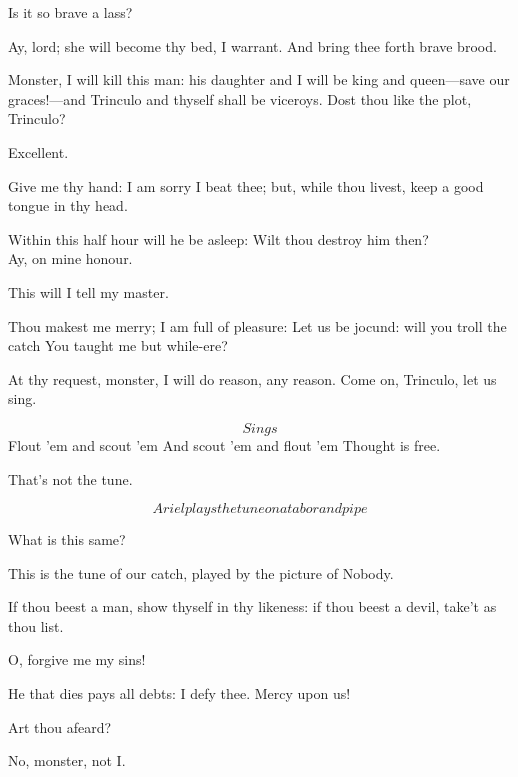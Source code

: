 \documentclass[11pt]{book}
\begin{document}
	Is it so brave a lass?

\5	Ay, lord; she will become thy bed, I warrant.
	And bring thee forth brave brood.

\begin{PROSE}

	Monster, I will kill this man: his daughter and I
	will be king and queen---save our graces!---and
	Trinculo and thyself shall be viceroys. Dost thou
	like the plot, Trinculo?

	Excellent.

	Give me thy hand: I am sorry I beat thee; but,
	while thou livest, keep a good tongue in thy head.

\end{PROSE}

\5	Within this half hour will he be asleep:
	Wilt thou destroy him then? \\

	Ay, on mine honour.

\4	This will I tell my master.

\5	Thou makest me merry; I am full of pleasure:
	Let us be jocund: will you troll the catch
	You taught me but while-ere?

\begin{PROSE}

	At thy request, monster, I will do reason, any
	reason. Come on, Trinculo, let us sing.

\end{PROSE}

	\[Sings\]
{ \Forma{}  \Locus \textus {+3em}
	Flout 'em and scout 'em
	And scout 'em and flout 'em
	Thought is free.
}

\begin{PROSE}

\5	That's not the tune.

	\[Ariel plays the tune on a tabor and pipe\]

	What is this same?

	This is the tune of our catch, played by the picture
	of Nobody.

	If thou beest a man, show thyself in thy likeness:
	if thou beest a devil, take't as thou list.

	O, forgive me my sins!

	He that dies pays all debts: I defy thee. Mercy upon us!

\5	Art thou afeard?

	No, monster, not I.

\end{PROSE}
\end{document}
